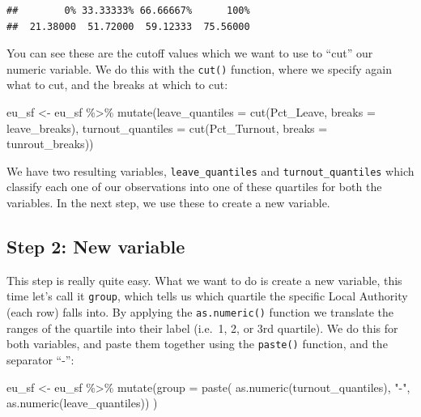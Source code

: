 \documentclass[
]{book}
\newenvironment{Shaded}{\begin{snugshade}}{\end{snugshade}}
\newcommand{\AttributeTok}[1]{\textcolor[rgb]{0.77,0.63,0.00}{#1}}
\newcommand{\FunctionTok}[1]{\textcolor[rgb]{0.00,0.00,0.00}{#1}}
\newcommand{\NormalTok}[1]{#1}
\newcommand{\OtherTok}[1]{\textcolor[rgb]{0.56,0.35,0.01}{#1}}
\newcommand{\SpecialCharTok}[1]{\textcolor[rgb]{0.00,0.00,0.00}{#1}}
\newcommand{\StringTok}[1]{\textcolor[rgb]{0.31,0.60,0.02}{#1}}
\begin{document}
\begin{verbatim}
##        0% 33.33333% 66.66667%      100% 
##  21.38000  51.72000  59.12333  75.56000
\end{verbatim}

You can see these are the cutoff values which we want to use to ``cut'' our numeric variable. We do this with the \texttt{cut()} function, where we specify again what to cut, and the breaks at which to cut:

\begin{Shaded}
\begin{Highlighting}[]
\NormalTok{eu\_sf }\OtherTok{\textless{}{-}}\NormalTok{ eu\_sf }\SpecialCharTok{\%\textgreater{}\%} 
  \FunctionTok{mutate}\NormalTok{(}\AttributeTok{leave\_quantiles =} \FunctionTok{cut}\NormalTok{(Pct\_Leave, }\AttributeTok{breaks =}\NormalTok{ leave\_breaks), }
         \AttributeTok{turnout\_quantiles =} \FunctionTok{cut}\NormalTok{(Pct\_Turnout, }\AttributeTok{breaks =}\NormalTok{ tunrout\_breaks))}
\end{Highlighting}
\end{Shaded}

We have two resulting variables, \texttt{leave\_quantiles} and \texttt{turnout\_quantiles} which classify each one of our observations into one of these quartiles for both the variables. In the next step, we use these to create a new variable.

\hypertarget{step-2-new-variable}{%
\subsection{Step 2: New variable}\label{step-2-new-variable}}

This step is really quite easy. What we want to do is create a new variable, this time let's call it \texttt{group}, which tells us which quartile the specific Local Authority (each row) falls into. By applying the \texttt{as.numeric()} function we translate the ranges of the quartile into their label (i.e.~1, 2, or 3rd quartile). We do this for both variables, and paste them together using the \texttt{paste()} function, and the separator ``-'':

\begin{Shaded}
\begin{Highlighting}[]
\NormalTok{eu\_sf }\OtherTok{\textless{}{-}}\NormalTok{ eu\_sf }\SpecialCharTok{\%\textgreater{}\%} 
  \FunctionTok{mutate}\NormalTok{(}\AttributeTok{group =} \FunctionTok{paste}\NormalTok{(}
      \FunctionTok{as.numeric}\NormalTok{(turnout\_quantiles), }\StringTok{"{-}"}\NormalTok{,}
      \FunctionTok{as.numeric}\NormalTok{(leave\_quantiles))}
\NormalTok{    )}
\end{Highlighting}
\end{Shaded}
\end{document}
